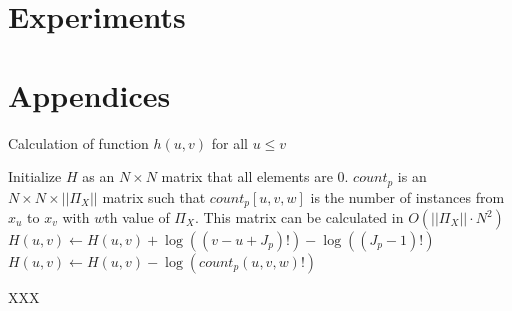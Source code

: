 \section{Experiments}









\section*{Appendices}

\begin{algorithm}
\caption{ Calculation of function $h(u,v)$ for all $u \leq v$}\label{euclid}
\begin{algorithmic}[1]
\State Initialize $H$ as an $N \times N$ matrix that all elements are 0.
\State $count_p$ is an $N \times N \times ||\Pi_X||$ matrix such that $count_p [u,v,w]$ is the number of instances from $x_u$ to $x_v$ with $w$th value of $\Pi_X$. This matrix can be calculated in $O(||\Pi_X|| \cdot N^2)$
\State $H(u,v) \leftarrow H(u,v) + \log((v-u + J_p)!) - \log((J_p -1)!)$
\State $H(u,v) \leftarrow H(u,v) - \log( count_p(u,v,w)!)$
\EndFor 
\EndFor
\EndFor

\State XXX
\EndFor
\end{algorithmic}
\end{algorithm}



